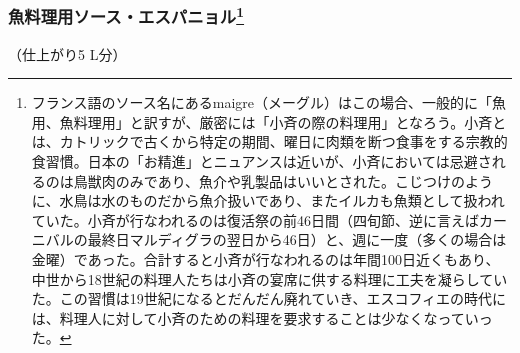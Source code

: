 \begin{recette}
\hypertarget{sauce-espagnole-maigre}{%
\subsubsection[魚料理用ソース・エスパニョル]{\texorpdfstring{魚料理用ソース・エスパニョル\footnote{フランス語のソース名にあるmaigre（メーグル）はこの場合、一般的に「魚用、魚料理用」と訳すが、厳密には「小斉の際の料理用」となろう。小斉とは、カトリックで古くから特定の期間、曜日に肉類を断つ食事をする宗教的食習慣。日本の「お精進」とニュアンスは近いが、小斉においては忌避されるのは鳥獣肉のみであり、魚介や乳製品はいいとされた。こじつけのように、水鳥は水のものだから魚介扱いであり、またイルカも魚類として扱われていた。小斉が行なわれるのは復活祭の前46日間（四旬節、逆に言えばカーニバルの最終日マルディグラの翌日から46日）と、週に一度（多くの場合は金曜）であった。合計すると小斉が行なわれるのは年間100日近くもあり、中世から18世紀の料理人たちは小斉の宴席に供する料理に工夫を凝らしていた。この習慣は19世紀になるとだんだん廃れていき、エスコフィエの時代には、料理人に対して小斉のための料理を要求することは少なくなっていった。}}{魚料理用ソース・エスパニョル}}\label{sauce-espagnole-maigre}}



（仕上がり5 L分）


\end{recette}
